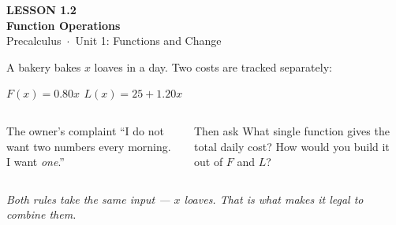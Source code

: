 \documentclass[aspectratio=169, 11pt]{beamer}
\begin{document}
{
\begin{frame}[plain]
  \vspace{2.8cm}\hspace{0.55cm}%
  \begin{minipage}{0.9\textwidth}
    {\color{goldacc}\bfseries\small LESSON 1.2}\\[0.5cm]
    {\color{white}\bfseries\LARGE Function Operations}\\[1.2cm]
    {\color{lilacmid}\small Precalculus~$\cdot$~Unit 1: Functions and Change}
  \end{minipage}
\end{frame}
}

\begin{frame}[t, plain]

  A bakery bakes \(x\) loaves in a day. Two costs are tracked separately:

  \bigskip
  \begin{center}
    {\Large\bfseries\color{plum} \(F(x) = 0.80x\) \qquad \(L(x) = 25 + 1.20x\)}
  \end{center}

  \bigskip
  \begin{columns}[T]
      \begin{block}{The owner's complaint}
        ``I do not want two numbers every morning. I want \textit{one}.''
      \end{block}

      \begin{block}{Then ask}
        What single function gives the total daily cost? How would you build it
        out of \(F\) and \(L\)?
      \end{block}
  \end{columns}

  \bigskip
  \textit{Both rules take the same input --- \(x\) loaves. That is what makes it
  legal to combine them.}
\end{frame}
\end{document}
